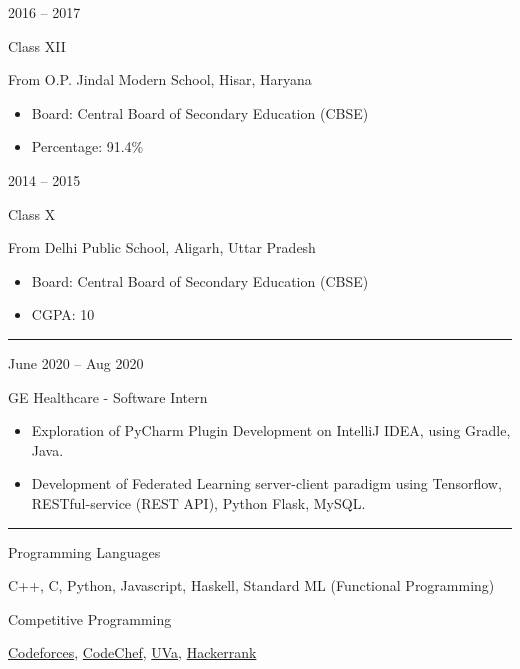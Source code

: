 \documentclass[a4paper,10pt]{article}
\newlength{\cvcolumngapwidth}
\newlength{\cvleftcolumnwidth}
\newlength{\cvrightcolumnwidth}
\newcommand{\cvsectionstyle}[1]{{\normalsize\cvsectionfont\textcolor{cvsectioncolor}{#1}}}
\newcommand{\cvtitlestyle}[1]{{\large\cvtitlefont\textcolor{cvtitlecolor}{#1}}}
\newcommand{\cvdurationstyle}[1]{{\small\cvdurationfont\textcolor{cvdurationcolor}{#1}}}
\newcommand{\cvheadingstyle}[1]{{\normalsize\cvheadingfont\textcolor{cvheadingcolor}{#1}}}
\newlength{\cvafteritemskipamount}
\newlength{\cvaftersectionskipamount}
\newlength{\cvbetweensectionandheadingextraskipamount}
\newlength{\cvaftertitleskipamount}
\newlength{\cvparskip}
\newcommand{\cvsection}[1]{
    \begin{minipage}[t]{\cvleftcolumnwidth}
        \raggedleft\cvsectionstyle{#1}
    \end{minipage}%
    \hspace{\cvcolumngapwidth}%
    \begin{minipage}[t]{\cvrightcolumnwidth}
        \textcolor{cvrulecolor}{\rule{\cvrightcolumnwidth}{0.3mm}}
    \end{minipage}

    \vspace{\cvaftersectionskipamount}
}
\newcommand{\cvitem}[2]{
    \begin{minipage}[t]{\cvleftcolumnwidth}
        \raggedleft #1
    \end{minipage}%
    \hspace{\cvcolumngapwidth}%
    \begin{minipage}[t]{\cvrightcolumnwidth}
        \setlength{\parskip}{\cvparskip} #2
    \end{minipage}

    \vspace{\cvafteritemskipamount}
}
\newcommand{\cvtitle}[1]{
    \cvtitlestyle{#1}

    \vspace{\cvaftertitleskipamount}
    \vspace{-\cvparskip}
}
\begin{document}
\cvitem{
    \cvdurationstyle{2016 -- 2017}
}{
    \cvtitle{Class XII}

    From O.P. Jindal Modern School, Hisar, Haryana

    \begin{itemize}[leftmargin=*]
        \item Board: Central Board of Secondary Education (CBSE)
        \item Percentage: 91.4\%
    \end{itemize}
}

\cvitem{
    \cvdurationstyle{2014 -- 2015}
}{
    \cvtitle{Class X}

    From Delhi Public School, Aligarh, Uttar Pradesh

    \begin{itemize}[leftmargin=*]
        \item Board: Central Board of Secondary Education (CBSE)
        \item CGPA: 10
    \end{itemize}
}


\cvsection{EXPERIENCE}

\vspace{\cvbetweensectionandheadingextraskipamount}

\cvitem{
    \cvdurationstyle{June 2020 -- Aug 2020}
}{
    \cvtitle{GE Healthcare - Software Intern}

    \begin{itemize}[leftmargin=*]
        \item Exploration of PyCharm Plugin Development on IntelliJ IDEA, using Gradle, Java.
        \item Development of Federated Learning server-client paradigm using Tensorflow, RESTful-service (REST API), Python Flask, MySQL.
    \end{itemize}
}


\cvsection{TECHNICAL SKILLS}

\vspace{\cvbetweensectionandheadingextraskipamount}

\cvitem{
    \cvheadingstyle{Programming Languages}
}{
    
    C++, C, Python, Javascript, Haskell, Standard ML (Functional Programming)

}
\cvitem{
    \cvheadingstyle{Competitive Programming}
}{
    
   \href{https://codeforces.com/profile/DSR}{Codeforces}, \href{https://www.codechef.com/users/devansh08}{CodeChef}, \href{https://uhunt.onlinejudge.org/id/1019683}{UVa}, \href{https://www.hackerrank.com/rathoredevansh}{Hackerrank}
}
\end{document}
